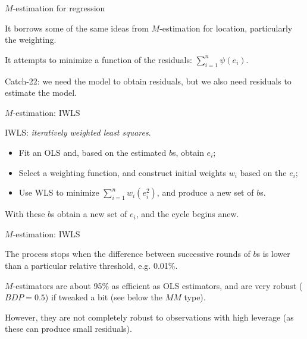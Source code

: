 \documentclass[12pt,english,pdf,xcolor=dvipsnames,aspectratio=169,handout]{beamer}\usepackage[]{graphicx}\usepackage[]{xcolor}
\begin{document}
\begin{frame}{$M$-estimation for regression}

It borrows some of the same ideas from $M$-estimation for location, particularly the weighting.\bigskip

It attempts to minimize a function of the residuals: $\sum_{i=1}^{n}\psi(e_i)$.\bigskip

Catch-22: we need the model to obtain residuals, but we also need residuals to estimate the model.

\end{frame}


\begin{frame}{$M$-estimation: IWLS}

IWLS: \textit{iteratively weighted least squares}.\bigskip

\begin{itemize}
\item Fit an OLS and, based on the estimated $b$s, obtain $e_i$;
\item Select a weighting function, and construct initial weights $w_i$ based on the $e_i$;
\item Use WLS to minimize $\sum_{i=1}^{n}w_i(e_i^2)$, and produce a new set of $b$s.
\end{itemize}\bigskip

With these $b$s obtain a new set of $e_i$, and the cycle begins anew.

\end{frame}


\begin{frame}{$M$-estimation: IWLS}

The process stops when the difference between successive rounds of $b$s is lower than a particular relative threshold, e.g. 0.01\%.\bigskip

$M$-estimators are about 95\% as efficient as OLS estimators, and are very robust ($BDP=0.5$) if tweaked a bit (see below the $MM$ type).\bigskip

However, they are not completely robust to observations with high leverage (as these can produce small residuals).

\end{frame}
\end{document}
